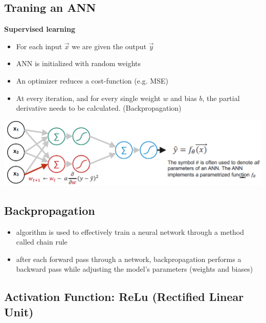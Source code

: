 \subsection{Traning an ANN}
\textbf{Supervised learning}
\begin{itemize}
    \item For each input $\vec{x}$ we are given the output $\vec{y}$
    \item ANN is initialized with random weights
    \item An optimizer reduces a cost-function (e.g. MSE)
    \item At every iteration, and for every single weight $w$ and bias $b$, the partial derivative needs to be calculated. (Backpropagation)
\end{itemize}
\includegraphics[width=\linewidth]{./img/train_ann.png}

\subsection{Backpropagation}
\begin{itemize}
    \item algorithm is used to effectively train a neural network through a method called chain rule
    \item after each forward pass through a network, backpropagation performs a backward pass while adjusting the model’s parameters (weights and biases)
\end{itemize}

\subsection{Activation Function: ReLu (Rectified Linear Unit)}

